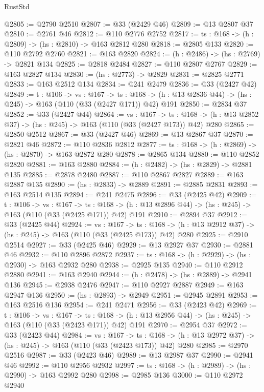 \begin{lexlean}{RustStd}
\begin{coremodule}
@2805 := @2790 @2510
@2807 := @33 (@2429 @46)
@2809 := @13 @2807 @37
@2810 := @2761 @46
@2812 := @110 @2776 @2752
@2817 := {ts : @168} -> (h : @2809) -> (hs : @2810) -> @163 @2812 @280
@2818 := @2805 @133
@2820 := @110 @2792 @2760
@2821 := @163 @2820
@2824 := (h : @2486) -> (hs : @2769) -> @2821 @134
@2825 := @2818 @2484
@2827 := @110 @2807 @2767
@2829 := @163 @2827 @134
@2830 := (hs : @2773) -> @2829
@2831 := @2825 @2771
@2833 := @163 @2512 @134
@2834 := @241 @2479
@2836 := @33 (@2427 @42)
@2849 := {t : @106} ->
  {vs : @167} ->
  {ts : @168} -> (h : @13 @2836 @44) -> (hs : @245) -> @163 (@110 (@33 (@2427 @171)) @42) @191
@2850 := @2834 @37
@2852 := @33 (@2427 @44)
@2864 := {vs : @167} ->
  {ts : @168} -> (h : @13 @2852 @37) -> (hs : @245) -> @163 (@110 (@33 (@2427 @173)) @42) @280
@2865 := @2850 @2512
@2867 := @33 (@2427 @46)
@2869 := @13 @2867 @37
@2870 := @2821 @46
@2872 := @110 @2836 @2812
@2877 := {ts : @168} -> (h : @2869) -> (hs : @2870) -> @163 @2872 @280
@2878 := @2865 @134
@2880 := @110 @2852 @2820
@2881 := @163 @2880
@2884 := (h : @2482) -> (hs : @2829) -> @2881 @135
@2885 := @2878 @2480
@2887 := @110 @2867 @2827
@2889 := @163 @2887 @135
@2890 := (hs : @2833) -> @2889
@2891 := @2885 @2831
@2893 := @163 @2514 @135
@2894 := @241 @2475
@2896 := @33 (@2425 @42)
@2909 := {t : @106} ->
  {vs : @167} ->
  {ts : @168} -> (h : @13 @2896 @44) -> (hs : @245) -> @163 (@110 (@33 (@2425 @171)) @42) @191
@2910 := @2894 @37
@2912 := @33 (@2425 @44)
@2924 := {vs : @167} ->
  {ts : @168} -> (h : @13 @2912 @37) -> (hs : @245) -> @163 (@110 (@33 (@2425 @173)) @42) @280
@2925 := @2910 @2514
@2927 := @33 (@2425 @46)
@2929 := @13 @2927 @37
@2930 := @2881 @46
@2932 := @110 @2896 @2872
@2937 := {ts : @168} -> (h : @2929) -> (hs : @2930) -> @163 @2932 @280
@2938 := @2925 @135
@2940 := @110 @2912 @2880
@2941 := @163 @2940
@2944 := (h : @2478) -> (hs : @2889) -> @2941 @136
@2945 := @2938 @2476
@2947 := @110 @2927 @2887
@2949 := @163 @2947 @136
@2950 := (hs : @2893) -> @2949
@2951 := @2945 @2891
@2953 := @163 @2516 @136
@2954 := @241 @2471
@2956 := @33 (@2423 @42)
@2969 := {t : @106} ->
  {vs : @167} ->
  {ts : @168} -> (h : @13 @2956 @44) -> (hs : @245) -> @163 (@110 (@33 (@2423 @171)) @42) @191
@2970 := @2954 @37
@2972 := @33 (@2423 @44)
@2984 := {vs : @167} ->
  {ts : @168} -> (h : @13 @2972 @37) -> (hs : @245) -> @163 (@110 (@33 (@2423 @173)) @42) @280
@2985 := @2970 @2516
@2987 := @33 (@2423 @46)
@2989 := @13 @2987 @37
@2990 := @2941 @46
@2992 := @110 @2956 @2932
@2997 := {ts : @168} -> (h : @2989) -> (hs : @2990) -> @163 @2992 @280
@2998 := @2985 @136
@3000 := @110 @2972 @2940

\end{coremodule}
\end{lexlean}
